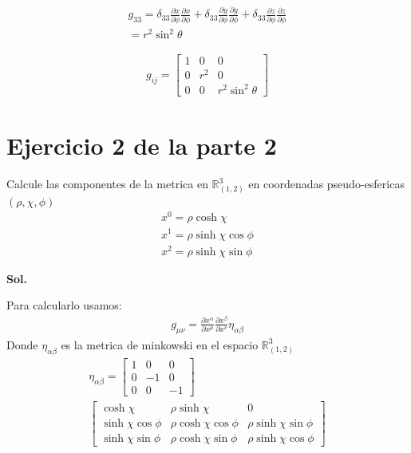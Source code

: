 \documentclass{article}
\begin{document}
\begin{gather*}
  g _{33 }  = \delta _{33 } \frac{\partial x  }{\partial \phi }\frac{\partial x  }{\partial \phi } + \delta _{33 } \frac{\partial y  }{\partial \phi}\frac{\partial y  }{\partial \phi } + \delta _{33 }  \frac{\partial z  }{\partial \phi} \frac{\partial z  }{\partial \phi }\\
  = r ^2 \sin ^2{\theta}
\end{gather*}

\begin{gather*}
  g _{ij }  = \begin{bmatrix}
      1 & 0 & 0 \\
      0 & r ^2 & 0 \\
      0 & 0 & r ^2 \sin ^2{\theta}
  \end{bmatrix}
\end{gather*}

\section{Ejercicio 2 de la parte 2 }
Calcule las componentes de la metrica en $ \mathbb{R}^ {3 }_{(1,2 )}  $ en coordenadas pseudo-esfericas $ (\rho, \chi,\phi) $
\begin{gather*}
  x ^ {0 } = \rho \cosh{\chi } \\
  x ^ {1 } = \rho \sinh{\chi }\cos{\phi} \\
  x ^ {2 } = \rho \sinh{\chi }\sin{\phi} 
\end{gather*}

\textbf{Sol. }

Para calcularlo usamos: 
\begin{gather*}
  g _{\mu \nu } = \frac{\partial x ^ {\alpha} }{\partial x ^ {\mu }}\frac{\partial x ^ {\beta} }{\partial x ^ {\nu}}\eta _{\alpha \beta}  
\end{gather*}
Donde $ \eta _{\alpha\beta} $ es la metrica de minkowski en el espacio $ \mathbb{R}^ {3 }_{(1,2)}  $
\begin{gather*}
  \eta _{\alpha\beta}  = \begin{bmatrix}
      1 & 0 & 0 \\
      0 & -1  & 0 \\
      0 & 0 & -1
  \end{bmatrix}  \\
  \begin{bmatrix}
      \cosh{\chi} & \rho \sinh{\chi } & 0  \\
      \sinh{\chi }\cos{\phi } & \rho \cosh{\chi }\cos{\phi } & \rho \sinh{\chi }\sin{\phi } \\
      \sinh{\chi }\sin{\phi } & \rho \cosh{\chi }\sin{\phi } & \rho \sinh{\chi }\cos{\phi}
  \end{bmatrix} 
\end{gather*}
\end{document}
